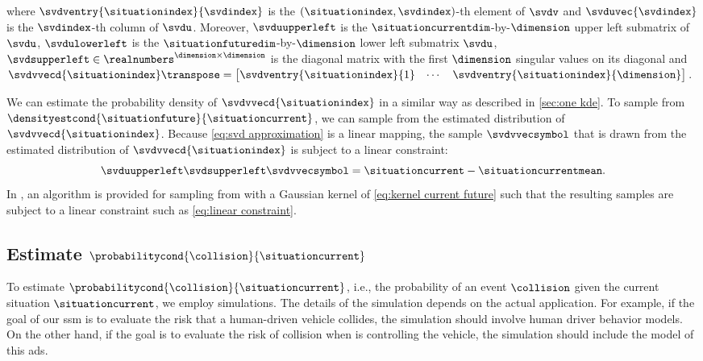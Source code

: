 where $\svdventry{\situationindex}{\svdindex}$ is the $(\situationindex,\svdindex)$-th element of $\svdv$ and $\svduvec{\svdindex}$ is the $\svdindex$-th column of $\svdu$.
Moreover, $\svduupperleft$ is the $\situationcurrentdim$-by-$\dimension$ upper left submatrix of $\svdu$, $\svdulowerleft$ is the $\situationfuturedim$-by-$\dimension$ lower left submatrix $\svdu$, $\svdsupperleft\in\realnumbers^{\dimension\times\dimension}$ is the diagonal matrix with the first $\dimension$ singular values on its diagonal and $\svdvvecd{\situationindex}\transpose = \begin{bmatrix} \svdventry{\situationindex}{1} & \cdots & \svdventry{\situationindex}{\dimension}	\end{bmatrix}$.

We can estimate the probability density of $\svdvvecd{\situationindex}$ in a similar way as described in \cref{sec:one kde}.
To sample from $\densityestcond{\situationfuture}{\situationcurrent}$, we can sample from the estimated distribution of $\svdvvecd{\situationindex}$.
Because \cref{eq:svd approximation} is a linear mapping, the sample $\svdvvecsymbol$ that is drawn from the estimated distribution of $\svdvvecd{\situationindex}$ is subject to a linear constraint:
\begin{equation}
	\label{eq:linear constraint}
	\svduupperleft \svdsupperleft \svdvvecsymbol = \situationcurrent - \situationcurrentmean.
\end{equation}
In \autocite{degelder2021conditional}, an algorithm is provided for sampling from  with a Gaussian kernel of \cref{eq:kernel current future} such that the resulting samples are subject to a linear constraint such as \cref{eq:linear constraint}.



\subsection{Estimate $\probabilitycond{\collision}{\situationcurrent}$}
\label{sec:estimate collision}

To estimate $\probabilitycond{\collision}{\situationcurrent}$, i.e., the probability of an event $\collision$ given the current situation $\situationcurrent$, we employ simulations. 
The details of the simulation depends on the actual application. 
For example, if the goal of our \ac{ssm} is to evaluate the risk that a human-driven vehicle collides, the simulation should involve human driver behavior models. 
On the other hand, if the goal is to evaluate the risk of collision when  is controlling the vehicle, the simulation should include the model of this \ac{ads}.

